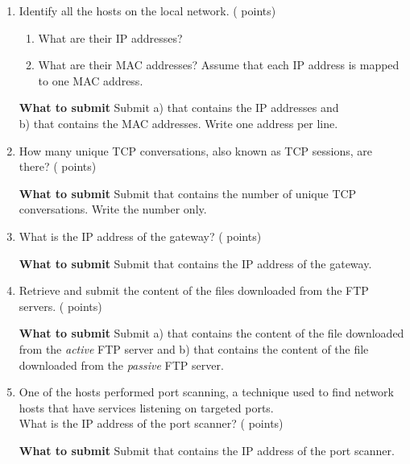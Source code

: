 \begin{enumerate}
  \item \hypertarget{cp1macip}{Identify all the hosts on the local network. ( points)} \label{itm:macip}

    \begin{enumerate}[label=\alph*),nosep]
      \item What are their IP addresses?
      \item What are their MAC addresses? Assume that each IP address is mapped to one MAC address.
    \end{enumerate}

    \textbf{What to submit}\hspace{10pt}
    Submit a) \texttt{\hyperlink{ipformat}{\fileip}} that contains the IP addresses and\\
    b) \texttt{\hyperlink{macformat}{\filemac}} that contains the MAC addresses.
    Write one address per line.

  \item \hypertarget{cp1tcp}{How many unique TCP conversations, also known as TCP sessions, are there? ( points)} \label{itm:tcp}

    \textbf{What to submit}\hspace{10pt}
    Submit \texttt{\hyperlink{tcpformat}{\filetcp}} that contains the number of unique TCP conversations.
    Write the number only.

  \item \hypertarget{cp1gw}{What is the IP address of the gateway? ( points)} \label{itm:gw}

    \textbf{What to submit}\hspace{10pt}
    Submit \texttt{\hyperlink{gwformat}{\filegw}} that contains the IP address of the gateway.
  \item \hypertarget{cp1ftp}{Retrieve and submit the content of the files downloaded from the FTP servers. ( points)} \label{itm:ftp}

    \textbf{What to submit}\hspace{10pt}
    Submit a) \texttt{\hyperlink{activeformat}{\fileactive}} that contains the content of the file downloaded from the \textit{active} FTP server
    and b) \texttt{\hyperlink{passiveformat}{\filepassive}} that contains the content of the file downloaded from the \textit{passive} FTP server.

  \item \hypertarget{cp1portscan}{One of the hosts performed port scanning, a technique used to find network hosts that have services listening on targeted ports.\\
  What is the IP address of the port scanner? ( points)} \label{itm:portscan}

    \textbf{What to submit}\hspace{10pt}
    Submit \texttt{\hyperlink{portscanformat}{\fileportscan}} that contains the IP address of the port scanner.

\end{enumerate}


